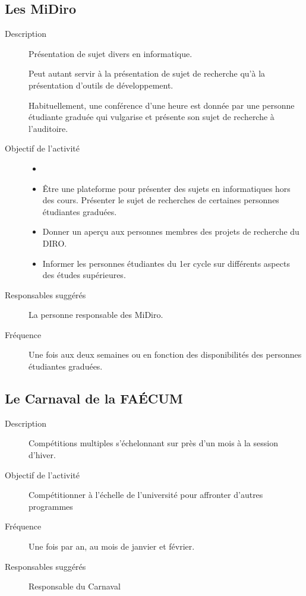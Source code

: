 \documentclass{aediroum}
\begin{document}
\subsection{Les MiDiro}\label{sec:midiros}
\begin{description}
	\item[Description] Présentation de sujet divers en informatique.

	Peut autant servir à la présentation de sujet de recherche qu'à la présentation d'outils de développement.

	Habituellement, une conférence d'une heure est donnée par une personne étudiante graduée qui vulgarise et présente son sujet de recherche à l’auditoire.
	\item[Objectif de l'activité]
	\begin{itemize}
		\item[]
		\item Être une plateforme pour présenter des sujets en informatiques hors des cours. Présenter le sujet de recherches de certaines personnes étudiantes graduées.
		\item Donner un aperçu aux personnes membres des projets de recherche du DIRO.
		\item Informer les personnes étudiantes du 1er cycle sur différents aspects des études supérieures.
	\end{itemize}
	\item[Responsables suggérés] La personne responsable des MiDiro.
 	\item[Fréquence] Une fois aux deux semaines ou en fonction des disponibilités des personnes étudiantes graduées.
\end{description}

\subsection{Le Carnaval de la FAÉCUM}\label{sec:carnaval}
\begin{description}
	\item[Description] Compétitions multiples s'échelonnant sur près d'un mois à la session d'hiver.
	\item[Objectif de l'activité] Compétitionner à l'échelle de l'université pour affronter d'autres programmes
	\item[Fréquence] Une fois par an, au mois de janvier et février.
	\item[Responsables suggérés] Responsable du Carnaval
\end{description}
\end{document}
